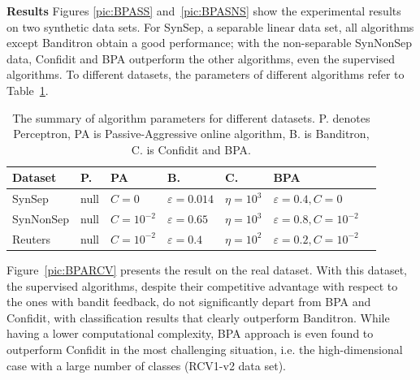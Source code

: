 \documentclass[preprint,12pt,authoryear]{elsarticle}
\begin{document}
\textbf{Results}
Figures \ref{pic:BPASS} and~\ref{pic:BPASNS} show the experimental results on two synthetic data sets. For SynSep, a separable linear data set, all algorithms except Banditron obtain a good performance; with the non-separable SynNonSep data, Confidit and BPA outperform the other algorithms, even the supervised algorithms.  To different datasets, the parameters of different algorithms refer to Table~\ref{table:bpa}.
\begin{table}[h]
	\caption{The summary of algorithm parameters for different datasets. P. denotes Perceptron, PA is Passive-Aggressive online algorithm, B. is Banditron, C. is Confidit and BPA.}
	\label{table:bpa}
	\begin{center}
		\begin{tabular}{lllllll}
			{\bf Dataset}  & {\bf P.} & {\bf PA } & {\bf B.}& {\bf C.} & {\bf BPA}\\
			\hline
			SynSep & null & $C=0$ & $\varepsilon = 0.014$ &$\eta = 10^3$ & $\varepsilon = 0.4,C = 0$\\
			
			SynNonSep & null & $C=10^{-2}$ & $\varepsilon =0.65$ & $\eta = 10^3$& $\varepsilon = 0.8,C = 10^{-2}$\\
			
			Reuters & null & $C=10^{-2}$ & $\varepsilon =0.4$ & $\eta = 10^2$ & $\varepsilon = 0.2,C = 10^{-2}$\\
			
			
			
		\end{tabular}
	\end{center}
\end{table}


Figure~\ref{pic:BPARCV} %
presents the result on the real dataset. With this dataset, the supervised algorithms, despite their competitive advantage with respect to the ones with bandit feedback, do not significantly depart from BPA and Confidit, with classification results that clearly outperform Banditron. While having a lower computational complexity, BPA approach is even found to outperform Confidit in the most challenging situation, i.e. the high-dimensional case with a large number of classes (RCV1-v2 data set).
\end{document}
